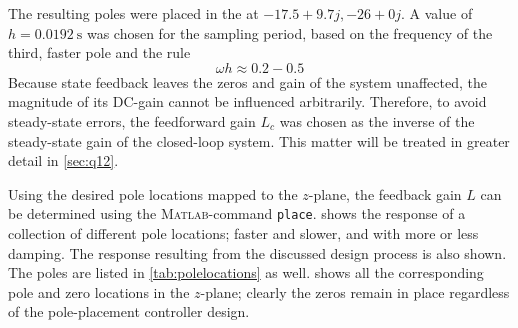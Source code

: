 The resulting poles were placed in the at $-17.5 + 9.7j, -26 + 0j$. A value of $h = \SI{0.0192}{\second}$ was chosen for the sampling period, based on the frequency of the third, faster pole and the rule \cite{astrom}
    $$ \omega h \approx 0.2-0.5 $$
Because state feedback leaves the zeros and gain of the system unaffected, the magnitude of its DC-gain cannot be influenced arbitrarily. Therefore, to avoid steady-state errors, the feedforward gain $L_c$ was chosen as the inverse of the steady-state gain of the closed-loop system. This matter will be treated in greater detail in \cref{sec:q12}.

Using the desired pole locations mapped to the $z$-plane, the feedback gain $L$ can be determined using the \textsc{Matlab}-command \texttt{place}.  shows the response of a collection of different pole locations; faster and slower, and with more or less damping. The response resulting from the discussed design process is also shown. The poles are listed in \cref{tab:polelocations} as well.  shows all the corresponding pole and zero locations in the $z$-plane; clearly the zeros remain in place regardless of the pole-placement controller design.
